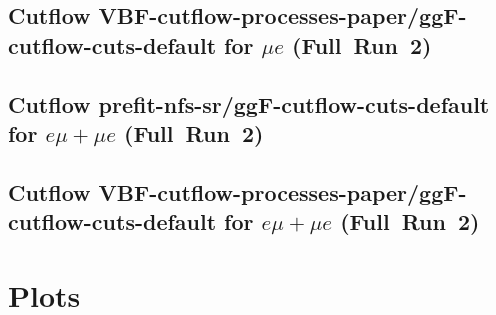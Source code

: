 \documentclass{article}
\begin{document}
\subsection[Cutflow VBF-cutflow-processes-paper/ggF-cutflow-cuts-default for \ensuremath{\mu{}e} (Full~Run~2)]{Cutflow VBF-cutflow-processes-paper/ggF-cutflow-cuts-default for \ensuremath{\mu{}e} (Full~Run~2)}

\centering


\subsection[Cutflow prefit-nfs-sr/ggF-cutflow-cuts-default for \ensuremath{e\mu+\mu{}e} (Full~Run~2)]{Cutflow prefit-nfs-sr/ggF-cutflow-cuts-default for \ensuremath{e\mu+\mu{}e} (Full~Run~2)}

\centering


\subsection[Cutflow VBF-cutflow-processes-paper/ggF-cutflow-cuts-default for \ensuremath{e\mu+\mu{}e} (Full~Run~2)]{Cutflow VBF-cutflow-processes-paper/ggF-cutflow-cuts-default for \ensuremath{e\mu+\mu{}e} (Full~Run~2)}

\centering


\section[Plots]{Plots}

\centering
\end{document}
